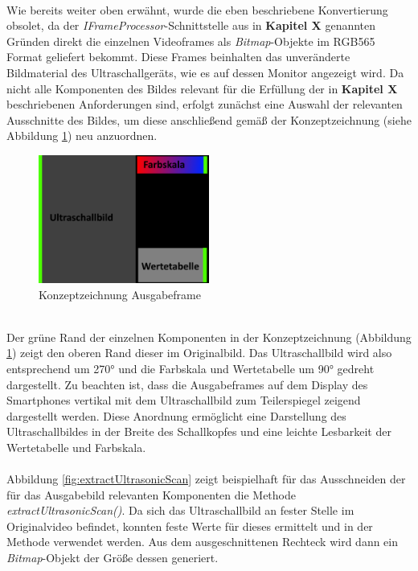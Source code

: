 ~\\
Wie bereits weiter oben erwähnt, wurde die eben beschriebene Konvertierung obsolet, da der \textit{IFrameProcessor}-Schnittstelle aus in \textbf{Kapitel X} genannten Gründen direkt die einzelnen Videoframes als \textit{Bitmap}-Objekte im RGB565 Format geliefert bekommt. Diese Frames beinhalten das unveränderte Bildmaterial des Ultraschallgeräts, wie es auf dessen Monitor angezeigt wird. Da nicht alle Komponenten des Bildes relevant für die Erfüllung der in \textbf{Kapitel X} beschriebenen Anforderungen sind, erfolgt zunächst eine Auswahl der relevanten Ausschnitte des Bildes, um diese anschließend gemäß der Konzeptzeichnung (siehe Abbildung \ref{fig:Ausgabeframe}) neu anzuordnen. 

\begin{figure}[h]
	\centering
	\includegraphics[width=0.5\textwidth]{Bilder/Bildverarbeitung/Konzept_Endframe.PNG}
	\caption{Konzeptzeichnung Ausgabeframe}
	\label{fig:Ausgabeframe}
\end{figure}

~\\
Der grüne Rand der einzelnen Komponenten in der Konzeptzeichnung (Abbildung \ref{fig:Ausgabeframe}) zeigt den oberen Rand dieser im Originalbild. Das Ultraschallbild wird also entsprechend um 270° und die Farbskala und Wertetabelle um 90° gedreht dargestellt. Zu beachten ist, dass die Ausgabeframes auf dem Display des Smartphones vertikal mit dem Ultraschallbild zum Teilerspiegel zeigend dargestellt werden. Diese Anordnung ermöglicht eine Darstellung des Ultraschallbildes in der Breite des Schallkopfes und eine leichte Lesbarkeit der Wertetabelle und Farbskala.
\\
\\
Abbildung \ref{fig:extractUltrasonicScan} zeigt beispielhaft für das Ausschneiden der für das Ausgabebild relevanten Komponenten die Methode \textit{extractUltrasonicScan()}. Da sich das Ultraschallbild an fester Stelle im Originalvideo befindet, konnten feste Werte für dieses ermittelt und in der Methode verwendet werden. Aus dem ausgeschnittenen Rechteck wird dann ein \textit{Bitmap}-Objekt der Größe dessen generiert.

